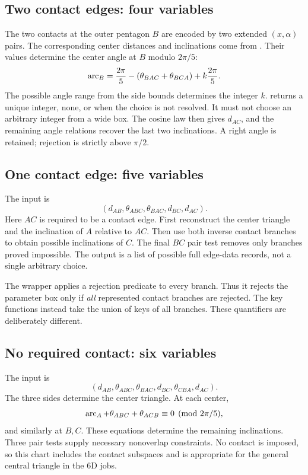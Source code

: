 \documentclass[11pt,a4paper]{article}
\newcommand{\code}[1]{\texttt{\detokenize{#1}}}
\theoremstyle{remark}\newtheorem*{contract}{Implementation contract}\newtheorem*{auditnote}{Audit note}
\begin{document}
\subsection{Two contact edges: four variables}
The two contacts at the outer pentagon $B$ are encoded by two extended
$(x,\alpha)$ pairs. The corresponding center distances and inclinations
come from \code{ellthetax}. Their values determine the center angle at $B$
modulo $2\pi/5$:
\[
\operatorname{arc}_B=\frac{2\pi}{5}-(\theta_{BAC}+\theta_{BCA})
       +k\frac{2\pi}{5}.
\]
The possible angle range from the side bounds determines the integer $k$.
\code{getint} returns a unique integer, none, or \code{Unstable} when the
choice is not resolved. It must not choose an arbitrary integer from a wide
box. The cosine law then gives $d_{AC}$, and the remaining angle relations
recover the last two inclinations. A right angle is retained; rejection is
strictly above $\pi/2$.



\subsection{One contact edge: five variables}
The input is
\[
(d_{AB},\theta_{ABC},\theta_{BAC},d_{BC},d_{AC}).
\]
Here $AC$ is required to be a contact edge. First reconstruct the center
triangle and the inclination of $A$ relative to $AC$. Then use both inverse
contact branches to obtain possible inclinations of $C$. The final $BC$ pair
test removes only branches proved impossible. The output is a list of
possible full edge-data records, not a single arbitrary choice.

The wrapper \code{forall_dom} applies a rejection predicate to every branch.
Thus it rejects the parameter box only if \emph{all} represented contact
branches are rejected. The key functions instead take the union of keys of
all branches. These quantifiers are deliberately different.

\subsection{No required contact: six variables}
The input is
\[
(d_{AB},\theta_{ABC},\theta_{BAC},d_{BC},\theta_{CBA},d_{AC}).
\]
The three sides determine the center triangle. At each center,
\[
\operatorname{arc}_A+\theta_{ABC}+\theta_{ACB}\equiv0\pmod{2\pi/5},
\]
and similarly at $B,C$. These equations determine the remaining inclinations.
Three pair tests supply necessary nonoverlap constraints. No contact is
imposed, so this chart includes the contact subspaces and is appropriate for
the general central triangle in the 6D jobs.
\end{document}
